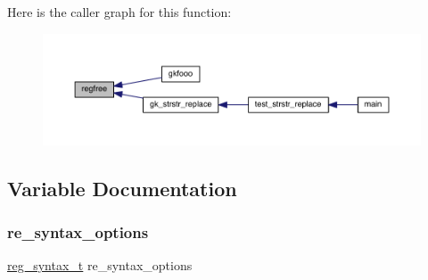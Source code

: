 Here is the caller graph for this function\+:\nopagebreak
\begin{figure}[H]
\begin{center}
\leavevmode
\includegraphics[width=350pt]{a00092_a87e79b6d048a32ffbfdb234c4166e769_icgraph}
\end{center}
\end{figure}


\subsection{Variable Documentation}
\mbox{\label{a00092_abdc5e67bbb6a48b740a95aef2bc3f5f2}} 
\subsubsection{\texorpdfstring{re\+\_\+syntax\+\_\+options}{re\_syntax\_options}}
{\footnotesize\ttfamily \hyperlink{a00092_a7e0565199a2fabaca3d67a5a44fc4229}{reg\+\_\+syntax\+\_\+t} re\+\_\+syntax\+\_\+options}

